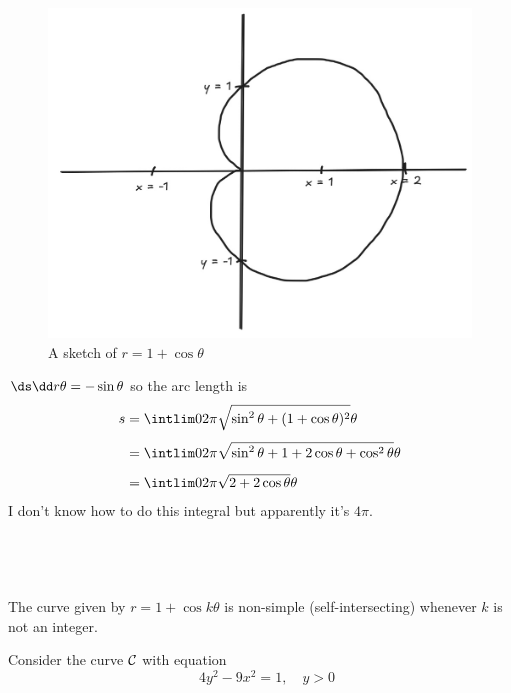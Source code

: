 \documentclass[a4paper]{article}
\begin{document}
\begin{figure}[h]
	\centering
	\includegraphics[scale=0.3]{Q1b}
	\caption{A sketch of $r = 1 + \cos\theta$}
\end{figure}

$\ds\dd r\theta = -\sin\theta$ so the arc length is \begin{align*}
s &= \intlim 0{2\pi} {\sqrt{\sin^2 \theta + (1 + \cos\theta)^2}} \theta\\[1ex]
&= \intlim 0{2\pi} {\sqrt{\sin^2 \theta + 1 + 2\cos\theta + \cos^2 \theta}} \theta\\[1ex]
&= \intlim 0{2\pi} {\sqrt{2 + 2\cos\theta}} \theta
\end{align*}
I don't know how to do this integral but apparently it's $4\pi$.

\subsection{~}

The curve given by $r = 1 + \cos k\theta$ is non-simple (self-intersecting) whenever $k$ is not an integer.


Consider the curve $\cal C$ with equation $$\quad 4y^2 - 9x^2 = 1, \quad y > 0$$

\subsection{~}
\end{document}
